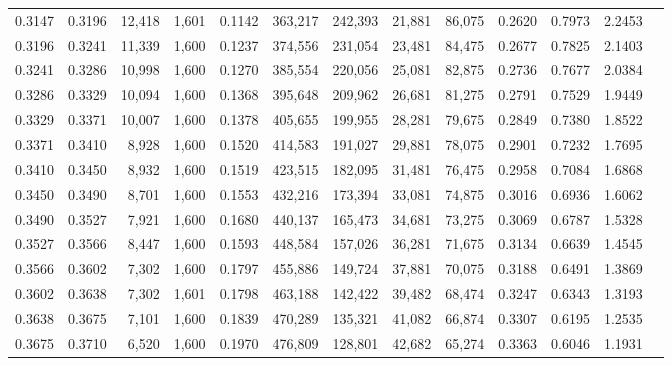 \begin{tabular}{rrrrrrrrrrrrr}
0.3147 & 0.3196 & 12,418 & 1,601 &                                     0.1142 & 363,217 & 242,393 &  21,881 &  86,075 & 0.2620 & 0.7973 & 2.2453 \\
0.3196 & 0.3241 & 11,339 & 1,600 &                                     0.1237 & 374,556 & 231,054 &  23,481 &  84,475 & 0.2677 & 0.7825 & 2.1403 \\
0.3241 & 0.3286 & 10,998 & 1,600 &                                     0.1270 & 385,554 & 220,056 &  25,081 &  82,875 & 0.2736 & 0.7677 & 2.0384 \\
0.3286 & 0.3329 & 10,094 & 1,600 &                                     0.1368 & 395,648 & 209,962 &  26,681 &  81,275 & 0.2791 & 0.7529 & 1.9449 \\
0.3329 & 0.3371 & 10,007 & 1,600 &                                     0.1378 & 405,655 & 199,955 &  28,281 &  79,675 & 0.2849 & 0.7380 & 1.8522 \\
0.3371 & 0.3410 &  8,928 & 1,600 &                                     0.1520 & 414,583 & 191,027 &  29,881 &  78,075 & 0.2901 & 0.7232 & 1.7695 \\
0.3410 & 0.3450 &  8,932 & 1,600 &                                     0.1519 & 423,515 & 182,095 &  31,481 &  76,475 & 0.2958 & 0.7084 & 1.6868 \\
0.3450 & 0.3490 &  8,701 & 1,600 &                                     0.1553 & 432,216 & 173,394 &  33,081 &  74,875 & 0.3016 & 0.6936 & 1.6062 \\
0.3490 & 0.3527 &  7,921 & 1,600 &                                     0.1680 & 440,137 & 165,473 &  34,681 &  73,275 & 0.3069 & 0.6787 & 1.5328 \\
0.3527 & 0.3566 &  8,447 & 1,600 &                                     0.1593 & 448,584 & 157,026 &  36,281 &  71,675 & 0.3134 & 0.6639 & 1.4545 \\
0.3566 & 0.3602 &  7,302 & 1,600 &                                     0.1797 & 455,886 & 149,724 &  37,881 &  70,075 & 0.3188 & 0.6491 & 1.3869 \\
0.3602 & 0.3638 &  7,302 & 1,601 &                                     0.1798 & 463,188 & 142,422 &  39,482 &  68,474 & 0.3247 & 0.6343 & 1.3193 \\
0.3638 & 0.3675 &  7,101 & 1,600 &                                     0.1839 & 470,289 & 135,321 &  41,082 &  66,874 & 0.3307 & 0.6195 & 1.2535 \\
0.3675 & 0.3710 &  6,520 & 1,600 &                                     0.1970 & 476,809 & 128,801 &  42,682 &  65,274 & 0.3363 & 0.6046 & 1.1931 \\

\end{tabular}
